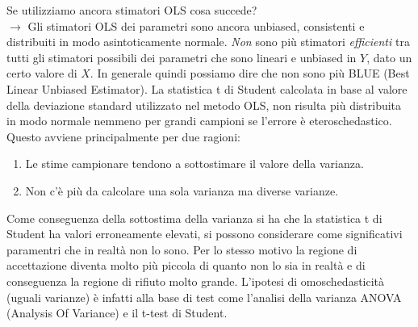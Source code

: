 \documentclass[]{article}
\begin{document}
Se utilizziamo ancora stimatori OLS cosa succede?\\
$\rightarrow$ Gli stimatori OLS dei parametri sono ancora unbiased, consistenti e distribuiti in modo asintoticamente normale. \textit{Non} sono più stimatori \textit{efficienti} tra tutti gli stimatori possibili dei parametri che sono lineari e unbiased in $Y$, dato un certo valore di $X$. In generale quindi possiamo dire che non sono più BLUE (Best Linear Unbiased Estimator).
La statistica t di Student calcolata in base al valore della deviazione standard utilizzato nel metodo OLS, non risulta più distribuita in modo normale nemmeno per grandi campioni se l'errore è eteroschedastico. Questo avviene principalmente per due ragioni:
\begin{enumerate}
\item Le stime campionare tendono a sottostimare il valore della varianza.
\item Non c'è più da calcolare una sola varianza ma diverse varianze.
\end{enumerate}
Come conseguenza della sottostima della varianza si ha che la statistica t di Student ha valori erroneamente elevati, si possono considerare come significativi paramentri che in realtà non lo sono. Per lo stesso motivo la regione di accettazione diventa molto più piccola di quanto non lo sia in realtà e di conseguenza la regione di rifiuto molto grande.
L'ipotesi di omoschedasticità (uguali varianze) è  infatti alla base di test come l'analisi della varianza ANOVA (Analysis Of Variance) e il t-test di Student.
\end{document}
